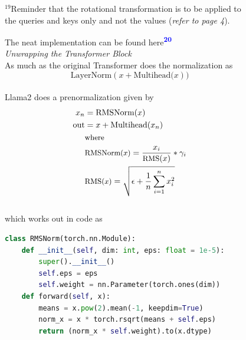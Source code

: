 \documentclass[12pt]{article}
\newcommand{\customtext}[3]{%
    \vspace{#2} %
    \fontsize{13}{8}\textcolor{#1}{\textit{#3}}%
}
\newcommand{\sidecite}[1]{\textsuperscript{\textcolor{blue}{\textbf{\scriptsize#1}}}}
\begin{document}
\begin{figure}[!htb]
\begin{minipage}[t]{0.65\textwidth}
\end{minipage}%
\hspace{25pt}
\begin{minipage}[t]{.4\textwidth}
  \raggedright
  \scriptsize 
  $^{19}$Reminder that the rotational transformation is to be applied to the queries and keys only and not the values
  ({\it refer to page 4}).
\end{minipage}
\end{figure}
\pagebreak
\begin{figure}[!htb]
    \begin{minipage}[t]{0.65\textwidth}
    \raggedright
{}
The neat implementation can be found here\sidecite{20}\\
\customtext{xtitle}{0em}{Unwrapping the Transformer Block}\\
As much as the original Transformer does the normalization as
\vspace{-1em}
$$\text{LayerNorm}(x  + \text{Multihead(}x))$$
\vspace{-2.7em}\\
Llama2 does a prenormalization given by
\vspace{-1em}
\begin{align*}
    x_n & = \text{RMSNorm}(x)\\
    \text{out} & = x  + \text{Multihead(}x_n)\\
    & \text{\small where}\\
    & \text{\small RMSNorm($x$)}=\frac{x_i}{\text{\small RMS}(x)}*\gamma_i\\
    & \text{\small RMS($x$)} = \sqrt{\epsilon+\frac{1}{n}\sum_{i=1}^nx_i^2}
\end{align*}
\vspace{-1.5em}\\
which works out in code as 
\begin{lstlisting}[language=python,style=python,basicstyle=\ttfamily\footnotesize]
class RMSNorm(torch.nn.Module):
    def __init__(self, dim: int, eps: float = 1e-5):
        super().__init__()
        self.eps = eps
        self.weight = nn.Parameter(torch.ones(dim))
    def forward(self, x):
        means = x.pow(2).mean(-1, keepdim=True)
        norm_x = x * torch.rsqrt(means + self.eps)
        return (norm_x * self.weight).to(x.dtype)


\end{lstlisting}
\end{minipage}
\end{figure}
\end{document}

